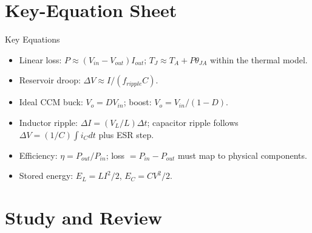 \documentclass[10pt,letterpaper]{article}
\begin{document}
\section{Key-Equation Sheet}
\begin{CornellExamBox}{Key Equations}
\begin{itemize}
  \item Linear loss: $P\approx(V_{in}-V_{out})I_{out}$; $T_J\approx T_A+P\theta_{JA}$ within the thermal model.
  \item Reservoir droop: $\Delta V\approx I/(f_{ripple}C)$.
  \item Ideal CCM buck: $V_o=DV_{in}$; boost: $V_o=V_{in}/(1-D)$.
  \item Inductor ripple: $\Delta I=(V_L/L)\Delta t$; capacitor ripple follows $\Delta V=(1/C)\int i_Cdt$ plus ESR step.
  \item Efficiency: $\eta=P_{out}/P_{in}$; loss $=P_{in}-P_{out}$ must map to physical components.
  \item Stored energy: $E_L=LI^2/2$, $E_C=CV^2/2$.
\end{itemize}\end{CornellExamBox}
\section{Study and Review}
\end{document}
